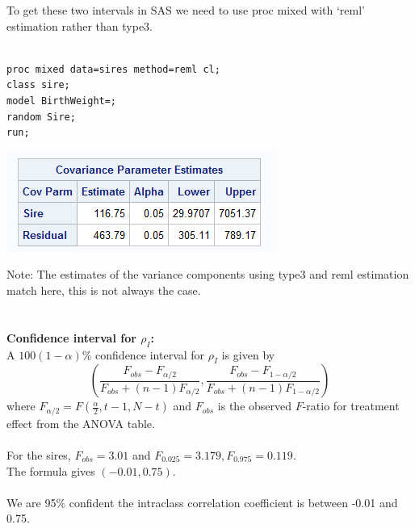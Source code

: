 \newpage
To get these two intervals in SAS we need to use proc mixed with `reml' estimation rather than type3.\\~\\
\begin{small}
\begin{verbatim}
proc mixed data=sires method=reml cl;
class sire; 
model BirthWeight=; 
random Sire; 
run;
\end{verbatim}
\end{small}

\begin{center}
\includegraphics[scale=0.9]{Sire4}
\end{center}

Note:  The estimates of the variance components using type3 and reml estimation match here, this is not always the case.\\~\\~\\
\textbf{Confidence interval for $\rho_I$:}\\
A $100(1-\alpha)\%$ confidence interval for $\rho_I$ is given by
$$\left(\frac{F_{obs}-F_{\alpha/2}}{F_{obs}+(n-1)F_{\alpha/2}},\frac{F_{obs}-F_{1-\alpha/2}}{F_{obs}+(n-1)F_{1-\alpha/2}}\right) $$
where $F_{\alpha/2}=F(\frac{\alpha}{2},t-1,N-t)$ and $F_{obs}$ is the observed $F$-ratio for treatment effect from the ANOVA table.\\~\\
For the sires, $F_{obs}=3.01$ and $F_{0.025}=3.179, F_{0.975} = 0.119$.\\
The formula gives $(-0.01,0.75)$.  \\~\\
We are 95\% confident the intraclass correlation coefficient is between -0.01 and 0.75.

